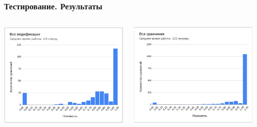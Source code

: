 \documentclass[10pt]{beamer}
\begin{document}
\begin{frame}\frametitle{Тестирование. Результаты}
		\begin{columns}
			\centering
			\includegraphics[scale=0.51]{res3.png}
			
			\centering
			\includegraphics[scale=0.51]{res4.png}
			
		\end{columns}
	\end{frame}
		
\end{document}
